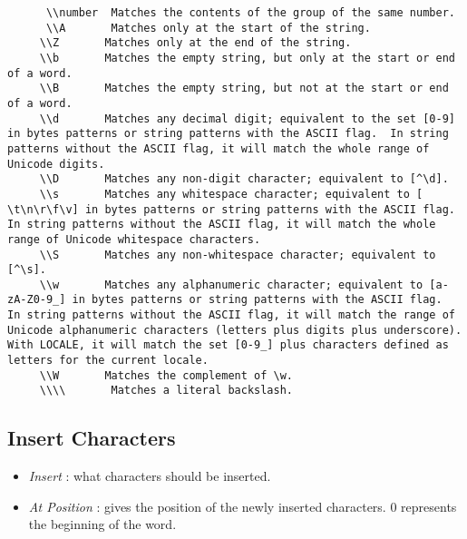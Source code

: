 \documentclass[12pt, a4paper]{scrartcl}
\begin{document}
\begin{itemize}
\begin{verbatim}
      \\number  Matches the contents of the group of the same number.
      \\A       Matches only at the start of the string.
     \\Z       Matches only at the end of the string.
     \\b       Matches the empty string, but only at the start or end of a word.
     \\B       Matches the empty string, but not at the start or end of a word.
     \\d       Matches any decimal digit; equivalent to the set [0-9] in bytes patterns or string patterns with the ASCII flag.  In string patterns without the ASCII flag, it will match the whole range of Unicode digits.
     \\D       Matches any non-digit character; equivalent to [^\d].
     \\s       Matches any whitespace character; equivalent to [ \t\n\r\f\v] in bytes patterns or string patterns with the ASCII flag.  In string patterns without the ASCII flag, it will match the whole range of Unicode whitespace characters.
     \\S       Matches any non-whitespace character; equivalent to [^\s].
     \\w       Matches any alphanumeric character; equivalent to [a-zA-Z0-9_] in bytes patterns or string patterns with the ASCII flag.  In string patterns without the ASCII flag, it will match the range of Unicode alphanumeric characters (letters plus digits plus underscore).  With LOCALE, it will match the set [0-9_] plus characters defined as letters for the current locale.
     \\W       Matches the complement of \w.
     \\\\       Matches a literal backslash.

\end{verbatim}
\end{itemize}
\subsection{Insert Characters}
\begin{itemize}
    \item \emph{Insert} : what characters should be inserted.
    \item \emph{At Position} : gives the position of the newly inserted characters. 0 represents the beginning of the word.
\end{itemize}
\end{document}
